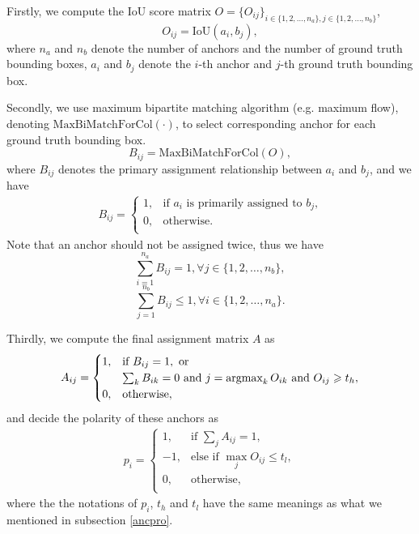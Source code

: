 Firstly, we compute the IoU score matrix $O = \{O_{ij}\}_{i \in \{1,2,\ldots,n_a\}, j \in \{1,2,\ldots,n_b\}}$,
\begin{equation}
	O_{ij} = \text{IoU}(a_i, b_j),
\end{equation}
where $n_a$ and $n_b$ denote the number of anchors and the number of ground truth bounding boxes, $a_i$ and $b_j$ denote the $i$-th anchor and $j$-th ground truth bounding box.

Secondly, we use maximum bipartite matching algorithm (e.g. maximum flow), denoting $\text{MaxBiMatchForCol}(\cdot)$, to select corresponding anchor for each ground truth bounding box.
\begin{equation}
	B_{ij} = \text{MaxBiMatchForCol}(O),
\end{equation}
where $B_{ij}$ denotes the primary assignment relationship between $a_i$ and $b_j$, and we have
\begin{equation}
\begin{aligned}
	B_{ij} = \begin{cases}
		1, & \text{if $a_i$ is primarily assigned to $b_j$,}\\
		0, & \text{otherwise}.\\
	\end{cases}
\end{aligned}
\end{equation}
Note that an anchor should not be assigned twice, thus we have
\begin{equation}
	\sum_{i=1}^{n_a}B_{ij} = 1, \forall j \in \{1,2,\ldots,n_b\},
\end{equation}
\begin{equation}
	\sum_{j=1}^{n_b}B_{ij} \leqslant 1, \forall i \in \{1,2,\ldots,n_a\}.
\end{equation}

Thirdly, we compute the final assignment matrix $A$ as
\begin{equation}
\begin{aligned}
	A_{ij} = \begin{cases}
		1, & \text{if } B_{ij} = 1,\text{ or }\\
		& \sum_{k}B_{ik} = 0 \text{ and } j = \operatorname*{argmax}_{k} O_{ik} \text{ and } O_{ij} \geqslant t_h, \\
		0, & \text{otherwise},\\
	\end{cases}
\end{aligned}
\end{equation}
and decide the polarity of these anchors as
\begin{equation}
\begin{aligned}
	p_i = \begin{cases}
		1, & \text{if } \sum_{j}A_{ij} = 1, \\
		-1, & \text{else if } \max_{j}O_{ij} \leqslant t_l, \\
		0, & \text{otherwise},\\
	\end{cases}
\end{aligned}
\end{equation}
where the the notations of $p_i$, $t_h$ and $t_l$ have the same meanings as what we mentioned in subsection \ref{ancpro}.

